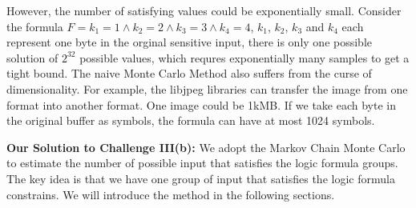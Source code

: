 However, the number of satisfying values could be exponentially small. Consider the formula
$F={k_1} = 1\land{k_2} = 2\land{k_3} = 3\land{k_4} = 4$, $k_1$, $k_2$, $k_3$ and $k_4$ each represent
one byte in the orginal sensitive input, there is only one possible solution of $2^{32}$ possible
values, which requres exponentially many samples to get a tight bound. 
The naive Monte Carlo Method also suffers from the curse of dimensionality. For example, 
the libjpeg libraries can transfer the image from one format into another format. One image could
be 1kMB. If we take each byte in the original buffer as symbols, the formula can have at most
1024 symbols. 

\textbf{Our Solution to Challenge III(b):}
We adopt the Markov Chain Monte Carlo to estimate the number of possible input
that satisfies the logic formula groups. The key idea is that we have one group of input that satisfies
the logic formula constrains.  We will
introduce the method in the following sections.
